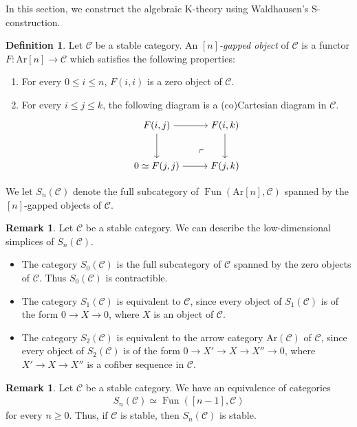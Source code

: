 \documentclass[a4paper,dvipdfmx,11pt,reqno]{amsart}
\DeclareMathOperator{\Fun}{Fun}
\newcommand{\C}{\mathcal{C}}
\newcommand{\Ar}{\mathrm{Ar}}
\theoremstyle{definition}
\newtheorem{definition}[theorem]{Definition}
\newtheorem{remark}[theorem]{Remark}
\begin{document}
In this section, we construct the algebraic K-theory using Waldhausen's S-construction. 

\begin{definition}
  Let $\C$ be a stable category.
  An \textit{$[n]$-gapped object} of $\C$ is a functor $F : \Ar[n] \to \C$ which satisfies the following properties:
  \begin{enumerate}
    \item For every $0 \leq i \leq n$, $F(i,i)$ is a zero object of $\C$.
    \item For every $i \leq j \leq k$, the following diagram is a (co)Cartesian diagram in $\C$.
    \[\begin{tikzpicture}[auto,->] 
      \node (tl) at (0,1.5) {$F(i,j)$}; 
      \node (tr) at (2.5,1.5) {$F(i,k)$};
      \node (bl) at (0,0) {$0 \simeq F(j,j)$}; 
      \node (br) at (2.5,0) {$F(j,k)$}; 
      \draw (tl) -- node {} (tr); 
      \draw (bl) -- node[swap] {} (br); 
      \draw (tl) -- node[swap] {} (bl);
      \draw (tr) -- node {} (br); 
      \node at ([xshift=-1.5cm, yshift=0.8cm] br.south east) {$\ulcorner$};
    \end{tikzpicture}\]
  \end{enumerate}
  We let $S_n(\C)$ denote the full subcategory of $\Fun(\Ar[n],\C)$ spanned by the $[n]$-gapped objects of $\C$.
\end{definition}

\begin{remark}
  Let $\C$ be a stable category.
  We can describe the low-dimensional simplices of $S_n(\C)$.
  \begin{itemize}
    \item The category $S_0(\C)$ is the full subcategory of $\C$ spanned by the zero objects of $\C$. 
    Thus $S_0(\C)$ is contractible.
    \item The category $S_1(\C)$ is equivalent to $\C$, since every object of $S_1(\C)$ is of the form $0 \to X \to 0$, where $X$ is an object of $\C$.
    \item The category $S_2(\C)$ is equivalent to the arrow category $\Ar(\C)$ of $\C$, since every object of $S_2(\C)$ is of the form $0 \to X' \to X \to X'' \to 0$, where $X' \to X \to X''$ is a cofiber sequence in $\C$. 
  \end{itemize}
\end{remark}

\begin{remark}
  Let $\C$ be a stable category.
  We have an equivalence of categories 
  \begin{align*}
    S_n(\C) \simeq \Fun([n-1],\C)
  \end{align*}
  for every $n \geq 0$.
  Thus, if $\C$ is stable, then $S_n(\C)$ is stable.
\end{remark}
\end{document}
